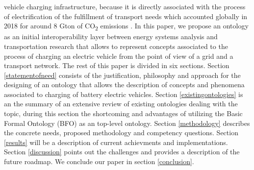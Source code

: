vehicle charging infrastructure, because it is directly associated with the
process of electrification of the fulfillment of transport needs which accounted
globally in 2018 for around 8 Gton of CO\textsubscript{2} emissions
\cite{IEA.2023}. In this paper, we propose an ontology as an initial
interoperability layer between energy systems analysis and transportation
research that allows to represent concepts associated to the process of charging
an electric vehicle from the point of view of a grid and a transport network.
The rest of this paper is divided in six sections. Section \ref{statementofneed}
consists of the justification, philosophy and approach for the designing of an
ontology that allows the description of concepts and phenomena associated to
charging of battery electric vehicles. Section \ref{existingontologies} is an
the summary of an extensive review of existing ontologies dealing with the
topic, during this section the shortcoming and advantages of utilizing the Basic
Formal Ontology (BFO) \cite{Arp.2015} as an top-level ontology. Section
\ref{methodology} describes the concrete needs, proposed methodology and
competency questions. Section \ref{results} will be a description of current
achievments and implementations. Section \ref{discussion} points out the
challenges and provides a description of the future roadmap. We conclude our
paper in section \ref{conclusion}.

